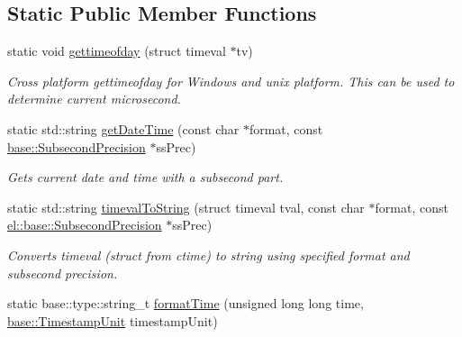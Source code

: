 \subsection*{Static Public Member Functions}
\begin{DoxyCompactItemize}
\item 
static void \hyperlink{classel_1_1base_1_1utils_1_1DateTime_ac000e6ecf705c2194a173d618ff4acfd}{gettimeofday} (struct timeval $\ast$tv)
\begin{DoxyCompactList}\small\item\em Cross platform gettimeofday for Windows and unix platform. This can be used to determine current microsecond. \end{DoxyCompactList}\item 
static std\-::string \hyperlink{classel_1_1base_1_1utils_1_1DateTime_afdbf02ed83d6312d63b0f3d114a44393}{get\-Date\-Time} (const char $\ast$format, const \hyperlink{classel_1_1base_1_1SubsecondPrecision}{base\-::\-Subsecond\-Precision} $\ast$ss\-Prec)
\begin{DoxyCompactList}\small\item\em Gets current date and time with a subsecond part. \end{DoxyCompactList}\item 
\hypertarget{classel_1_1base_1_1utils_1_1DateTime_a18d429b13ddeece5eaf0cee1a6f9e7bf}{static std\-::string \hyperlink{classel_1_1base_1_1utils_1_1DateTime_a18d429b13ddeece5eaf0cee1a6f9e7bf}{timeval\-To\-String} (struct timeval tval, const char $\ast$format, const \hyperlink{classel_1_1base_1_1SubsecondPrecision}{el\-::base\-::\-Subsecond\-Precision} $\ast$ss\-Prec)}\label{classel_1_1base_1_1utils_1_1DateTime_a18d429b13ddeece5eaf0cee1a6f9e7bf}

\begin{DoxyCompactList}\small\item\em Converts timeval (struct from ctime) to string using specified format and subsecond precision. \end{DoxyCompactList}\item 
\hypertarget{classel_1_1base_1_1utils_1_1DateTime_a1eea58fffe291c969a526d08515d29d7}{static base\-::type\-::string\-\_\-t \hyperlink{classel_1_1base_1_1utils_1_1DateTime_a1eea58fffe291c969a526d08515d29d7}{format\-Time} (unsigned long long time, \hyperlink{namespaceel_1_1base_a1b886858c6409097395b24b1bdf03c39}{base\-::\-Timestamp\-Unit} timestamp\-Unit)}\label{classel_1_1base_1_1utils_1_1DateTime_a1eea58fffe291c969a526d08515d29d7}


\end{DoxyCompactItemize}
